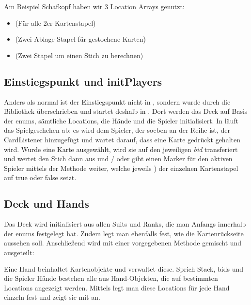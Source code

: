 Am Beispiel Schafkopf haben wir 3 Location Arrays genutzt:

\begin{itemize}
	\item {} (Für alle 2er Kartenstapel)
	\item {} (Zwei Ablage Stapel für gestochene Karten)
	\item {} (Zwei Stapel um einen Stich zu berechnen)
\end{itemize}

\subsection{Einstiegspunkt und initPlayers}

Anders als normal ist der Einstiegspunkt nicht in , sondern
wurde durch die Bibliothek überschrieben und startet deshalb in .
Dort werden das Deck auf Basis der enums, sämtliche Locations, die Hände und
die Spieler initialisiert. In  läuft das Spielgeschehen ab:
es wird dem Spieler, der soeben an der Reihe ist, der CardListener hinzugefügt
und  wartet darauf, dass eine Karte gedrückt
gehalten wird. Wurde eine Karte ausgewählt, wird sie auf den jeweiligen
\emph{bid} transferiert und  wertet den Stich dann aus und
/ oder gibt einen Marker für den aktiven Spieler mittels der Methode
 weiter, welche jeweils
) der einzelnen Kartenstapel auf true oder false setzt.

\subsection{Deck und Hands}

Das Deck wird initialisiert aus allen Suits und Ranks, die man Anfangs
innerhalb der enums festgelegt hat. Zudem legt man ebenfalls fest, wie die
Kartenrückseite aussehen soll. Anschließend wird mit einer vorgegebenen Methode
gemischt und ausgeteilt:


Eine Hand beinhaltet Kartenobjekte und verwaltet diese. Sprich Stack, bids und
die Spieler Hände bestehen alle aus Hand-Objekten, die auf bestimmten Locations
angezeigt werden. Mittels  legt man diese Locations für jede Hand einzeln
fest und zeigt sie mit  an.

